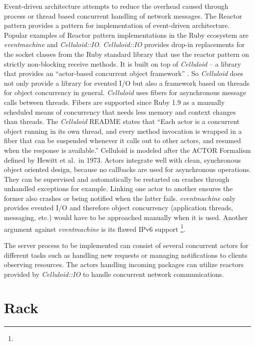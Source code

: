 	Event-driven architecture attempts to reduce the overhead caused through
	process or thread based concurrent handling of network messages. The
	Reactor pattern \cite{reactor-1} \cite{reactor-2} provides a pattern for
	implementation of event-driven architecture. Popular examples of Reactor
	pattern implementations in the Ruby ecosystem are \emph{eventmachine} and
	\emph{Celluloid::IO}. \emph{Celluloid::IO} provides drop-in replacements
	for the socket classes from the Ruby standard library that use the reactor
	pattern on strictly non-blocking receive methods. It is built on top of
	\emph{Celluloid} -- a library that provides an \enquote{actor-based
	concurrent object framework} \cite{celluloid}. So \emph{Celluloid} does not
	only provide a library for evented I/O but also a framework based on
	threads for object concurrency in general. \emph{Celluloid} uses fibers for
	asynchronous message calls between threads. Fibers are supported since Ruby
	1.9 as a manually scheduled means of concurrency that needs less memory and
	context changes than threads. The \emph{Celluloid} README
	\cite{celluloid-readme} states that \enquote{Each actor is a concurrent
	object running in its own thread, and every method invocation is wrapped in
	a fiber that can be suspended whenever it calls out to other actors, and
	resumed when the response is available.} Celluloid is modeled after the
	ACTOR Formalism defined by Hewitt et al.\ in 1973. Actors integrate well
	with clean, synchronous object oriented design, because no callbacks are
	used for asynchronous operations. They can be supervised and automatically
	be restarted on crashes through unhandled exceptions for example. Linking
	one actor to another ensures the former also crashes or being notified when
	the latter fails. \emph{eventmachine} only provides evented I/O and
	therefore object concurrency (application threads, messaging, etc.) would
	have to be approached manually when it is used. Another argument against
	\emph{eventmachine} is its flawed \acs{IPv6} support \footnote{\urlEMSix}.

	The server process to be implemented can consist of several concurrent
	actors for different tasks such as handling new requests or managing
	notifications to clients observing resources. The actors handling incoming
	packages can utilize reactors provided by \emph{Celluloid::IO}
	\cite{celluloid-io} to handle concurrent network communications. 

\section{Rack}
\label{cha:background:rack}

